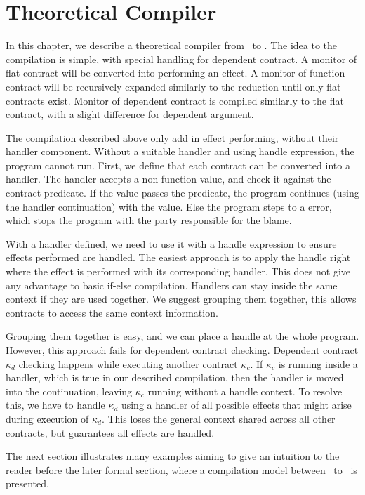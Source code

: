 \chapter{Theoretical Compiler}
\label{chap:compiler}

In this chapter, we describe a theoretical compiler from \langc\ to \lange. The
idea to the compilation is simple, with special handling for dependent contract.
A monitor of flat contract will be converted into performing an effect. A
monitor of function contract will be recursively expanded similarly to the
reduction until only flat contracts exist. Monitor of dependent contract is
compiled similarly to the flat contract, with a slight difference for dependent
argument.

The compilation described above only add in effect performing, without their
handler component. Without a suitable handler and using handle expression, the
program cannot run. First, we define that each contract can be converted into a
handler. The handler accepts a non-function value, and check it against the
contract predicate. If the value passes the predicate, the program continues
(using the handler continuation) with the value. Else the program steps to a
error, which stops the program with the party responsible for the blame.

With a handler defined, we need to use it with a handle expression to ensure
effects performed are handled. The easiest approach is to apply the handle right
where the effect is performed with its corresponding handler. This does not give
any advantage to basic if-else compilation. Handlers can stay inside the same
context if they are used together. We suggest grouping them together, this
allows contracts to access the same context information.

Grouping them together is easy, and we can place a handle at the whole program.
However, this approach fails for dependent contract checking. Dependent contract
$\kappa_d$ checking happens while executing another contract $\kappa_c$. If
$\kappa_c$ is running inside a handler, which is true in our described
compilation, then the handler is moved into the continuation, leaving $\kappa_c$
running without a handle context. To resolve this, we have to handle $\kappa_d$
using a handler of all possible effects that might arise during execution of
$\kappa_d$. This loses the general context shared across all other contracts,
but guarantees all effects are handled.

The next section illustrates many examples aiming to give an intuition to the
reader before the later formal section, where a compilation model between
\langc\ to \lange\ is presented.

